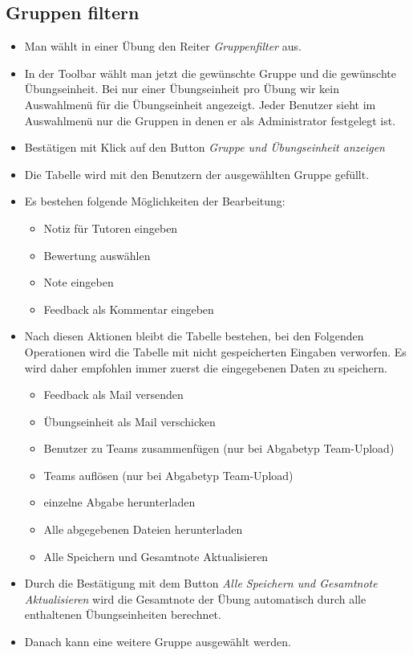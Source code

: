 \subsection*{Gruppen filtern}
\begin{itemize}
	\item Man wählt in einer Übung den Reiter \textit{Gruppenfilter} aus.
	\item In der Toolbar wählt man jetzt die gewünschte Gruppe und die gewünschte Übungseinheit. Bei nur einer Übungseinheit pro Übung wir kein Auswahlmenü für die Übungseinheit angezeigt. Jeder Benutzer sieht im Auswahlmenü nur die Gruppen in denen er als Administrator festgelegt ist.
	\item Bestätigen mit Klick auf den Button \textit{Gruppe und Übungseinheit anzeigen}
	\item Die Tabelle wird mit den Benutzern der ausgewählten Gruppe gefüllt.
	\item Es bestehen folgende Möglichkeiten der Bearbeitung: 
	\begin{itemize}
		\item Notiz für Tutoren eingeben
		\item Bewertung auswählen
		\item Note eingeben
		\item Feedback als Kommentar eingeben
		
	\end{itemize}
	\item Nach diesen Aktionen bleibt die Tabelle bestehen, bei den Folgenden Operationen wird die Tabelle mit nicht gespeicherten Eingaben verworfen. Es wird daher empfohlen immer zuerst die eingegebenen Daten zu speichern.
	\begin{itemize}
		\item Feedback als Mail versenden
		\item Übungseinheit als Mail verschicken
		\item Benutzer zu Teams zusammenfügen (nur bei Abgabetyp Team-Upload)
		\item Teams auflösen (nur bei Abgabetyp Team-Upload)
		\item einzelne Abgabe herunterladen
		\item Alle abgegebenen Dateien herunterladen
		\item Alle Speichern und Gesamtnote Aktualisieren
	\end{itemize}
	\item Durch die Bestätigung mit dem Button \textit{Alle Speichern und Gesamtnote Aktualisieren} wird die Gesamtnote der Übung automatisch durch alle enthaltenen Übungseinheiten berechnet.
	\item Danach kann eine weitere Gruppe ausgewählt werden.
\end{itemize}

\clearpage